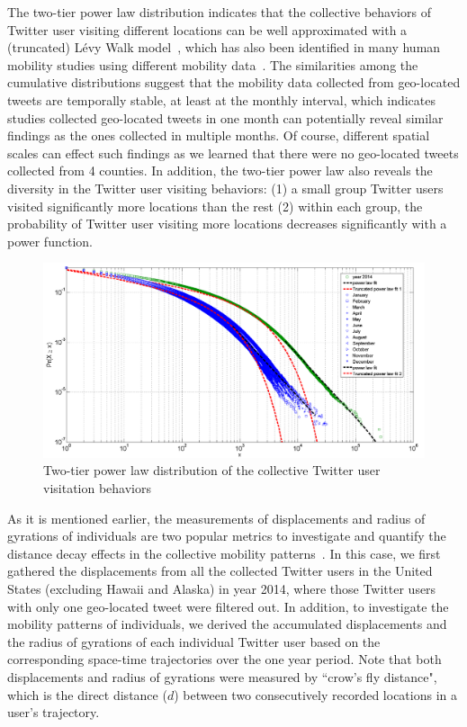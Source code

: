 \documentclass[a4paper, 11pt]{article}
\begin{document}
The two-tier power law distribution indicates that the collective behaviors of Twitter user visiting different locations can be well approximated with a (truncated) L\'{e}vy Walk model~\citep{ reynolds2012truncated, rhee2011levy}, which has also been identified in many human mobility studies using different mobility data~\citep{zhao2015explaining}.
The similarities among the cumulative distributions suggest that the mobility data collected from geo-located tweets are temporally stable, at least at the monthly interval, which indicates studies collected geo-located tweets in one month can potentially reveal similar findings as the ones collected in multiple months. 
Of course, different spatial scales can effect such findings as we learned that there were no geo-located tweets collected from 4 counties.
In addition, the two-tier power law also reveals the diversity in the Twitter user visiting behaviors: (1) a small group Twitter users visited significantly more locations than the rest (2) within each group, the probability of Twitter user visiting more locations decreases significantly with a power function.

\begin{figure}[h]
\centering
\includegraphics[width=1.0\linewidth]{./figures/visitation2}
\caption{Two-tier power law distribution of the collective Twitter user visitation behaviors}
\label{fig:Arch}
\end{figure}
\FloatBarrier

As it is mentioned earlier, the measurements of displacements and radius of gyrations of individuals are two popular metrics to investigate and quantify the distance decay effects in the collective mobility patterns~\citep{gonzalez2008understanding}. In this case, we first gathered the displacements from all the collected Twitter users in the United States (excluding Hawaii and Alaska) in year 2014, where those Twitter users with only one geo-located tweet were filtered out. 
In addition, to investigate the mobility patterns of individuals, we derived the accumulated displacements and the radius of gyrations of each individual Twitter user based on the corresponding space-time trajectories over the one year period.
Note that both displacements and radius of gyrations were measured by ``crow's fly distance", which is the direct distance ($d$) between two consecutively recorded locations in a user's trajectory.
\end{document}
